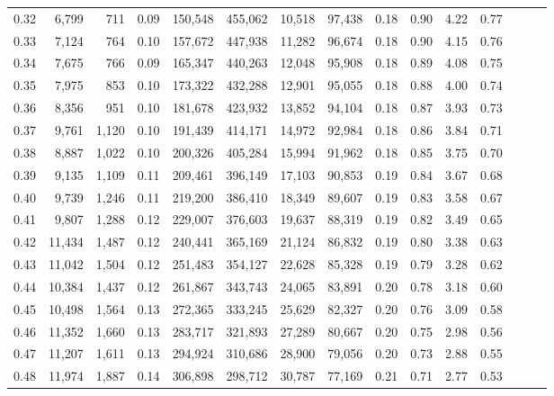 \begin{tabular}{rrrrrrrrrrrrrrr}
0.32 &   6,799 &    711 &  0.09 &  150,548 &  455,062 &   10,518 &   97,438 &  0.18 &  0.90 &  4.22 &      0.77 \\
0.33 &   7,124 &    764 &  0.10 &  157,672 &  447,938 &   11,282 &   96,674 &  0.18 &  0.90 &  4.15 &      0.76 \\
0.34 &   7,675 &    766 &  0.09 &  165,347 &  440,263 &   12,048 &   95,908 &  0.18 &  0.89 &  4.08 &      0.75 \\
0.35 &   7,975 &    853 &  0.10 &  173,322 &  432,288 &   12,901 &   95,055 &  0.18 &  0.88 &  4.00 &      0.74 \\
0.36 &   8,356 &    951 &  0.10 &  181,678 &  423,932 &   13,852 &   94,104 &  0.18 &  0.87 &  3.93 &      0.73 \\
0.37 &   9,761 &  1,120 &  0.10 &  191,439 &  414,171 &   14,972 &   92,984 &  0.18 &  0.86 &  3.84 &      0.71 \\
0.38 &   8,887 &  1,022 &  0.10 &  200,326 &  405,284 &   15,994 &   91,962 &  0.18 &  0.85 &  3.75 &      0.70 \\
0.39 &   9,135 &  1,109 &  0.11 &  209,461 &  396,149 &   17,103 &   90,853 &  0.19 &  0.84 &  3.67 &      0.68 \\
0.40 &   9,739 &  1,246 &  0.11 &  219,200 &  386,410 &   18,349 &   89,607 &  0.19 &  0.83 &  3.58 &      0.67 \\
0.41 &   9,807 &  1,288 &  0.12 &  229,007 &  376,603 &   19,637 &   88,319 &  0.19 &  0.82 &  3.49 &      0.65 \\
0.42 &  11,434 &  1,487 &  0.12 &  240,441 &  365,169 &   21,124 &   86,832 &  0.19 &  0.80 &  3.38 &      0.63 \\
0.43 &  11,042 &  1,504 &  0.12 &  251,483 &  354,127 &   22,628 &   85,328 &  0.19 &  0.79 &  3.28 &      0.62 \\
0.44 &  10,384 &  1,437 &  0.12 &  261,867 &  343,743 &   24,065 &   83,891 &  0.20 &  0.78 &  3.18 &      0.60 \\
0.45 &  10,498 &  1,564 &  0.13 &  272,365 &  333,245 &   25,629 &   82,327 &  0.20 &  0.76 &  3.09 &      0.58 \\
0.46 &  11,352 &  1,660 &  0.13 &  283,717 &  321,893 &   27,289 &   80,667 &  0.20 &  0.75 &  2.98 &      0.56 \\
0.47 &  11,207 &  1,611 &  0.13 &  294,924 &  310,686 &   28,900 &   79,056 &  0.20 &  0.73 &  2.88 &      0.55 \\
0.48 &  11,974 &  1,887 &  0.14 &  306,898 &  298,712 &   30,787 &   77,169 &  0.21 &  0.71 &  2.77 &      0.53 \\

\end{tabular}
